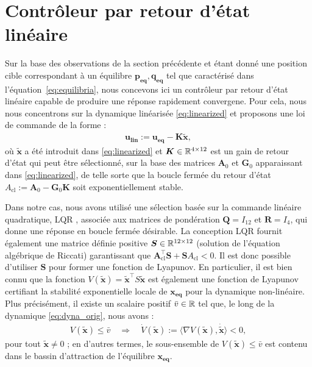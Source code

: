 \section{Contrôleur par retour d'état linéaire}
\label{sec:ctrlLin}
Sur la base des observations de la section précédente et étant donné une position cible correspondant à un équilibre $\boldsymbol{p_{\text{eq}}}, \boldsymbol{q_{\text{eq}}}$ tel que caractérisé dans l'équation~\ref{eq:equilibria}, nous concevons ici un contrôleur par retour d'état linéaire capable de produire une réponse rapidement convergene. Pour cela, nous nous concentrons sur la dynamique linéarisée \eqref{eq:linearized} et proposons une loi de commande de la forme :
\begin{align}
  \boldsymbol{u_{\text{lin}}} := \boldsymbol{u_{\text{eq}}} - \boldsymbol{K} \boldsymbol{\tilde x},
\label{eq:u_lin}
\end{align}
où $\boldsymbol{\tilde x}$ a été introduit dans \eqref{eq:linearized} et $\boldsymbol{K} \in {\mathbb R}^{4 \times 12}$ est un gain de retour d'état qui peut être sélectionné, sur la base des matrices $\boldsymbol{A}_{0}$ et $\boldsymbol{G}_{0}$ apparaissant dans \eqref{eq:linearized}, de telle sorte que la boucle fermée du retour d'état $A_{\text{cl}}:=\boldsymbol{A}_{0}-\boldsymbol{G}_{0}\boldsymbol{K}$ soit exponentiellement stable. 

Dans notre cas, nous avons utilisé une sélection basée sur la commande linéaire quadratique, LQR , associée aux matrices de pondération $\boldsymbol{Q} = I_{12}$ et $\boldsymbol{R} = I_{4}$, qui donne une réponse en boucle fermée désirable. La conception LQR fournit également une matrice définie positive  $\boldsymbol{S} \in {\mathbb R}^{12 \times 12}$ (solution de l'équation algébrique de Riccati) garantissant que $\boldsymbol{A}_{\text{cl}}^\top \boldsymbol{S} + \boldsymbol{S} A_{\text{cl}} <0$. Il est donc possible d'utiliser $\boldsymbol{S}$ pour former une fonction de Lyapunov.  En particulier, il est bien connu que la fonction $V(\boldsymbol{\tilde x}) = \boldsymbol{\tilde x}^\top S \boldsymbol{\tilde x}$ est également une fonction de Lyapunov certifiant la stabilité exponentielle locale de $\boldsymbol{x_{\text{eq}}}$ pour la dynamique non-linéaire. Plus précisément, il existe un scalaire positif $\bar v \in {\mathbb R}$ tel que, le long de la dynamique \eqref{eq:dyna_orig}, nous avons :
\begin{align}
\label{eq:Vdecrease}
  V(\boldsymbol{\tilde x}) \leq \bar v \quad \Rightarrow \quad \dot V(\boldsymbol{\tilde x}) := \langle 
\nabla V(\boldsymbol{\tilde x}), \boldsymbol{\dot{\tilde x}}\rangle <0,
\end{align}
pour tout $\boldsymbol{\tilde x} \neq 0$ ; en d'autres termes, le sous-ensemble de $V(\boldsymbol{\tilde x}) \leq \bar v$ est contenu dans le bassin d'attraction de l'équilibre $\boldsymbol{x_{\text{eq}}}$.

